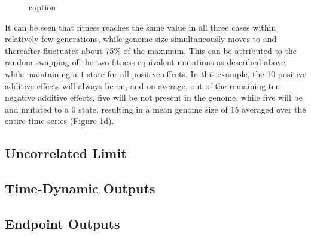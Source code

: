 \documentclass[paper=a4, fontsize=11pt,twoside]{scrartcl}       %
\begin{document}
\begin{figure}
	\centering
	\label{fig:sub1}
	\label{fig:sub2}
	\label{fig:sub3}
	\label{additivedynamics:sub4}
	\caption{caption}
	\label{additivedynamics}
\end{figure}

It can be seen that fitness reaches the same value in all three cases within relatively few generations, while genome size simultaneously moves to and thereafter fluctuates about 75\% of the maximum. This can be attributed to the random swapping of the two fitness-equivalent mutations as described above, while maintaining a $1$ state for all positive effects. In this example, the 10 positive additive effects will always be on, and on average, out of the remaining ten negative additive effects, five will be not present in the genome, while five will be and mutated to a $0$ state, resulting in a mean genome size of 15 averaged over the entire time series (Figure \ref{additivedynamics}d). 

\subsection*{Uncorrelated Limit}

\subsection*{Time-Dynamic Outputs}

\subsection*{Endpoint Outputs}
\end{document}
